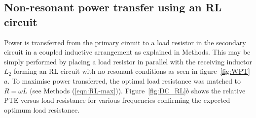 \documentclass[11pt]{iopart}
\begin{document}
\subsection*{Non-resonant power transfer using an RL circuit}
Power is transferred from the primary circuit to a load resistor in
the secondary circuit in a coupled inductive arrangement as explained
in Methods. This may be simply performed by placing a load resistor in
parallel with the receiving inductor $L_2$ forming an RL circuit with no resonant conditions as
seen in figure~\ref{fig:WPT}$a$. To maximise power transferred, the
optimal load resistance was matched to $R = \omega L$ (see Methods
(\ref{eqn:RL-max})). Figure~\ref{fig:DC_RL}$b$ shows the
relative PTE versus load resistance for various frequencies confirming
the expected optimum load resistance.
\end{document}
